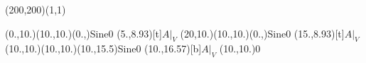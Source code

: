 \unitlength=1bp%

\begin{feynartspicture}(200,200)(1,1)

\FADiagram{}
\FAProp(0.,10.)(10.,10.)(0.,){Sine}{0}
\FALabel(5.,8.93)[t]{$A|_V$}
\FAProp(20,10.)(10.,10.)(0.,){Sine}{0}
\FALabel(15.,8.93)[t]{$A|_V$}
\FAProp(10.,10.)(10.,10.)(10.,15.5){Sine}{0}
\FALabel(10.,16.57)[b]{$A|_V$}
\FAVert(10.,10.){0}
\end{feynartspicture}

